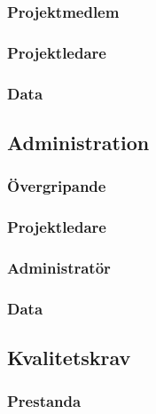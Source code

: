 \documentclass[a4paper]{article}
\begin{document}
\subsubsection{Projektmedlem}

\subsubsection{Projektledare}

\subsubsection{Data}








\subsection{Administration}
\subsubsection{Övergripande}

\subsubsection{Projektledare}

\subsubsection{Administratör}

\subsubsection{Data}


\subsection{Kvalitetskrav}

\subsubsection{Prestanda}

\end{document}
